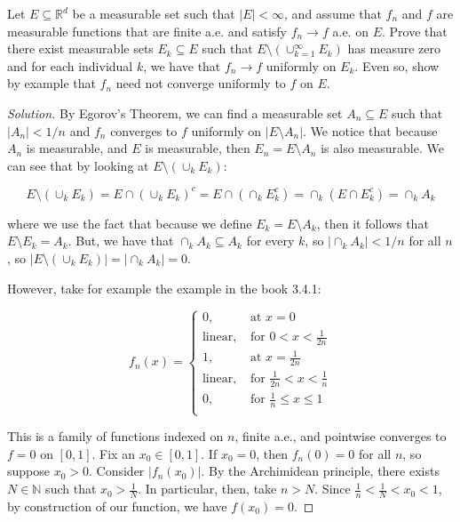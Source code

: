 \documentclass[10pt]{article}
\newenvironment{problem}[2][Problem]{\begin{trivlist}
\item[\hskip \labelsep {\bfseries #1}\hskip \labelsep {\bfseries #2.}]}{\end{trivlist}}
\begin{document}
\begin{problem}{3.4.7}
Let $E \subseteq \mathbb{R}^d$ be a measurable set such that $|E| < \infty$, and assume that $f_n$ and $f$ are measurable functions that are finite a.e. and satisfy $f_n \to f$ a.e. on $E$. Prove that there exist measurable sets $E_k \subseteq E$ such that $E \setminus (\cup_{k=1}^\infty E_k)$ has measure zero and for each individual $k$, we have that $f_n \to f$ uniformly on $E_k$. Even so, show by example that $f_n$ need not converge uniformly to $f$ on $E$.
\end{problem}
\begin{proof}[Solution]

By Egorov's Theorem, we can find a measurable set $A_n \subseteq E$ such that $|A_n| < 1/n$ and $f_n$ converges to $f$ uniformly on $|E \setminus A_n|$. We notice that because $A_n$ is measurable, and $E$ is measurable, then $E_n = E \setminus A_n$ is also measurable. We can see that by looking at $E \setminus (\cup_k E_k)$:

$$ E \setminus (\cup_k E_k) = E \cap (\cup_k E_k)^c =  E \cap (\cap_k E_k^c) = \cap_k (E \cap E_k^c) = \cap_k A_k $$

where we use the fact that because we define $E_k = E \setminus A_k$, then it follows that $E \setminus E_k = A_k$. But, we have that $\cap_k A_k \subseteq A_k$ for every $k$, so $|\cap_k A_k| < 1/n$ for all $n$, so $|E \setminus (\cup_k E_k)| =  |\cap_k A_k| = 0$.

However, take for example the example in the book 3.4.1:

$$ f_n(x) = \begin{cases} 0, & \text{ at } x= 0 \\
\text{linear}, & \text{ for } 0 < x < \frac{1}{2n} \\
1, & \text{ at } x = \frac{1}{2n} \\
\text{linear}, & \text{ for } \frac{1}{2n} < x < \frac{1}{n} \\
0, & \text{ for } \frac{1}{n} \leq x \leq 1 \\
\end{cases} $$

This is a family of functions indexed on $n$, finite a.e., and pointwise converges to $f = 0$ on $[0,1]$. Fix an $x_0 \in [0,1]$. If $x_0 = 0$, then $f_n(0) = 0$ for all $n$, so suppose $x_0 > 0$. Consider $|f_n(x_0)|$. By the Archimidean principle, there exists $N \in \mathbb{N}$ such that $x_0 > \frac{1}{N}$. In particular, then, take $n > N$. Since $\frac{1}{n} < \frac{1}{N} < x_0 < 1$, by construction of our function, we have $f(x_0) = 0$.


\end{proof}
\end{document}

